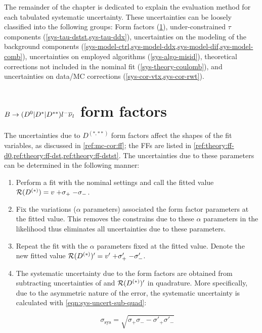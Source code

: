 The remainder of the chapter is dedicated to explain the evaluation method
for each tabulated systematic uncertainty.
These uncertainties can be loosely classified into the following groups:
Form factors (\cref{sys-ff}),
under-constrained $\tau$ components (\cref{sys-tau-dstst,sys-tau-ddx}),
uncertainties on the modeling of the background components
(\cref{sys-model-ctrl,sys-model-ddx,sys-model-dif,sys-model-comb}),
uncertainties on employed algorithms (\cref{sys-algo-misid}),
theoretical corrections not included in the nominal fit
(\cref{sys-theory-coulomb}),
and uncertainties on data/MC corrections
(\cref{sys-cor-vtx,sys-cor-rwt}).


\section{$B \rightarrow ({{D}^0}|{{D}^*}|D^{**}){l^-}{{\overline{\nu}}_l}$ form factors}
\label{sys-ff}

The uncertainties due to $D^{(*,**)}$ form factors affect the shapes of the fit
variables,
as discussed in \cref{ref:mc-cor:ff};
the FFs are listed in
\cref{ref:theory:ff-d0,ref:theory:ff-dst,ref:theory:ff-dstst}.
The uncertainties due to these parameters can be determined in the following
manner:

\begin{enumerate}
    \item Perform a fit with the nominal settings and call
        the fitted value $\mathcal{R}(D^{(*)}) = v\;{+\sigma_+}\;{-\sigma_-}$.
    \item Fix the variations ($\alpha$ parameters) associated the form factor
        parameters at the fitted value.
        This removes the constrains due to these $\alpha$ parameters in the
        likelihood thus
        eliminates all uncertainties due to these parameters.
    \item Repeat the fit with the $\alpha$ parameters fixed at the fitted
        value.
        Denote the new fitted value
        $\mathcal{R}(D^{(*)})' = v'\;{+\sigma'_+}\;{-\sigma'_-}$.
    \item The systematic uncertainty due to the form factors are
        obtained from subtracting uncertainties of \RDX and $\mathcal{R}(D^{(*)})'$ in
        quadrature.
        More specifically, due to the asymmetric nature of the error,
        the systematic uncertainty is calculated with
        \cref{eqn:sys-uncert-sub-quad}:

        \begin{equation}
            \sigma_\text{sys} = \sqrt{\sigma_+ \sigma_- - \sigma'_+ \sigma'_-}
            \label{eqn:sys-uncert-sub-quad}
        \end{equation}
\end{enumerate}

